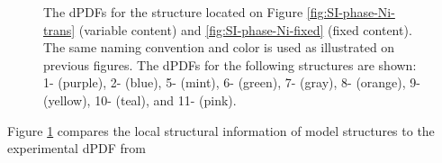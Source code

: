\documentclass[12pt]{article}
\begin{document}
\begin{figure}[H]
    \caption{
    The dPDFs for the structure located on Figure \ref{fig:SI-phase-Ni-trans} (variable  content) and \ref{fig:SI-phase-Ni-fixed} (fixed  content). The same naming convention and color is used as illustrated on previous figures. The dPDFs for the following structures are shown:
        1- (purple),               %
        2- (blue),                 %
        5- (mint),                  %
        6- (green),            %
        7- (gray),             %
        8- (orange),          %
        9- (yellow),           %
        10- (teal), and    %
        11- (pink).        %
    }
    \label{fig:SI-structure-diagram}
\end{figure}

Figure \ref{fig:SI-structure-diagram} compares the local structural information of model structures to the experimental dPDF from 

\newpage
\end{document}
